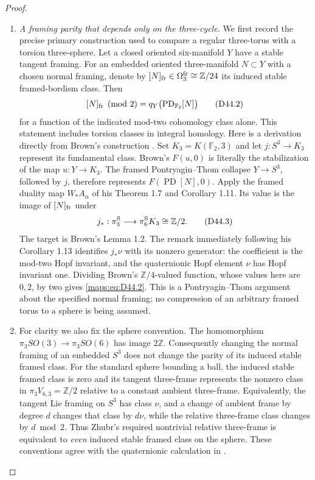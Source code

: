 \begin{proof}
\begin{enumerate}[label=\arabic*.,leftmargin=*]
\item \emph{A framing parity that depends only on the three-cycle.}
We first record the precise primary construction used to compare a
regular three-torus with a torsion three-sphere.
Let a closed oriented six-manifold $Y$ have a stable tangent framing.
For an embedded oriented three-manifold $N\subset Y$ with a chosen
normal framing, denote by $[N]_{\rm fr}\in\Omega^{\rm fr}_3
\cong\mathbb Z/24$ its induced stable framed-bordism class. Then
\[
 [N]_{\rm fr}\pmod2
   =q_Y\bigl(\operatorname{PD}_{\mathbb F_2}[N]\bigr)             \tag{D44.2}\label{maps:eq:D44.2}
\]
for a function of the indicated mod-two cohomology class alone.
This statement includes torsion classes in integral homology.
Here is a derivation directly from Brown's construction
\cite[pp.369--372]{ffBrown72}. Set $K_3=K(\mathbb F_2,3)$ and let
$j:S^3\to K_3$ represent its fundamental class. Brown's $F(u,0)$
is literally the stabilization of the map $u:Y\to K_3$.
The framed Pontryagin--Thom collapse $Y\to S^3$, followed by $j$,
therefore represents $F(\operatorname{PD}[N],0)$.
Apply the framed duality map $W_*A_\alpha$ of his Theorem 1.7 and
Corollary 1.11. Its value is the image of $[N]_{\rm fr}$ under
\[
 j_*:\pi_3^{\rm S}\longrightarrow\pi_6^{\rm S}K_3
          \cong\mathbb Z/2.                                  \tag{D44.3}\label{maps:eq:D44.3}
\]
The target is Brown's Lemma 1.2. The remark immediately following
his Corollary 1.13 identifies $j_*\nu$ with its nonzero generator:
the coefficient is the mod-two Hopf invariant, and the quaternionic
Hopf element $\nu$ has Hopf invariant one. Dividing Brown's
$\mathbb Z/4$-valued function, whose values here are $0,2$, by two
gives \eqref{maps:eq:D44.2}. This is a Pontryagin--Thom argument about the specified
normal framing; no compression of an arbitrary framed torus to a
sphere is being assumed.

\item For clarity we also fix the sphere convention. The homomorphism
$\pi_3SO(3)\to\pi_3SO(6)$ has image $2\mathbb Z$.
Consequently changing the normal framing of an embedded $S^3$
does not change the parity of its induced stable framed class.
For the standard sphere bounding a ball, the induced stable framed
class is zero and its tangent three-frame represents the nonzero
class in $\pi_3V_{6,3}=\mathbb Z/2$ relative to a constant ambient
three-frame. Equivalently, the tangent Lie framing on $S^3$ has
class $\nu$, and a change of ambient frame by degree $d$ changes
that class by $d\nu$, while the relative three-frame class changes
by $d\bmod2$. Thus Zhubr's required nontrivial relative
three-frame is equivalent to \emph{even} induced stable framed
class on the sphere. These conventions agree with the quaternionic
calculation in \cite[Section 5]{ffZhubr13}.


\end{enumerate}
\end{proof}
